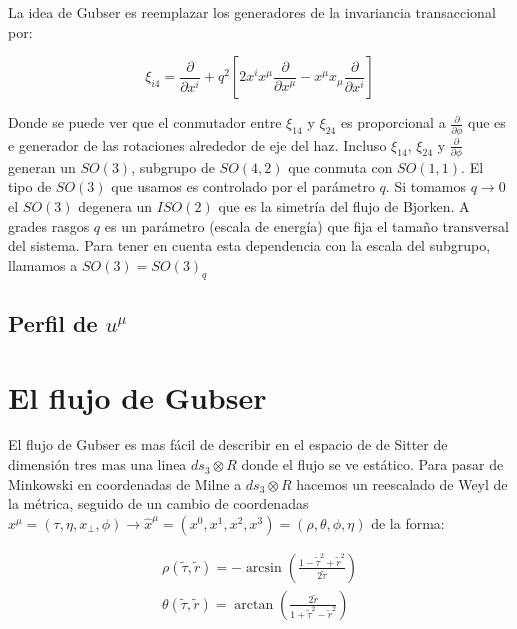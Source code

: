 \documentclass[11pt,a4paper]{article}
\begin{document}
La idea de Gubser es reemplazar los generadores de la invariancia transaccional por:

\begin{equation}
\xi_{{i}{4}}=
\frac{\partial}{\partial{x}^i}
+q^2[2x^ix^{\mu}\frac{\partial}{\partial{x}^{\mu}}-x^{\mu}x_{\mu}\frac{\partial}{\partial{x}^i}]
\end{equation}

Donde se puede ver que el conmutador entre $\xi_{{1}{4}}$ y $\xi_{{2}{4}}$ es proporcional a $\frac{\partial}{\partial\phi}$ que es e generador de las rotaciones alrededor de eje del haz. Incluso  $\xi_{{1}{4}}$, $\xi_{{2}{4}}$ y $\frac{\partial}{\partial\phi}$ generan un $SO(3)$, subgrupo de $SO(4,2)$ que conmuta con $SO(1,1)$. El tipo de $SO(3)$ que usamos es controlado por el parámetro $q$. Si tomamos $q\rightarrow{0}$ el $SO(3)$ degenera un $ISO(2)$ que es la simetría del flujo de Bjorken. A grades rasgos $q$ es un parámetro (escala de energía) que fija el tamaño transversal del sistema. Para tener en cuenta esta dependencia con la escala del subgrupo, llamamos a $SO(3)=SO(3)_{q}$

\subsection{Perfil de $u^{\mu}$}


\section{El flujo de Gubser}

El flujo de Gubser es mas fácil de describir en el espacio de de Sitter de dimensión tres mas una linea $ds_{3}{\otimes}R$ donde el flujo se ve estático. Para pasar de Minkowski en coordenadas de Milne a $ds_{3}{\otimes}R$ hacemos un reescalado de Weyl de la métrica, seguido de un cambio de coordenadas $x^{\mu}=(\tau,\eta,x_{\bot},\phi)\rightarrow{\hat{x}^{\mu}}=(x^{0},x^{1},x^{2},x^{3})=(\rho,\theta,\phi,\eta)$ de la forma:


\begin{subequations}
\begin{align}
\rho(\tilde{\tau},\tilde{r})=-\arcsin(\frac{1-{\tilde{\tau}}^2+{\tilde{r}}^2}{2\tilde{\tau}})\\
\theta(\tilde{\tau},\tilde{r})=\arctan(\frac{2\tilde{r}}{1+{\tilde{\tau}}^2-{\tilde{r}}^2})
\end{align}
\label{cambio_de_coordenadas}
\end{subequations}
\end{document}
